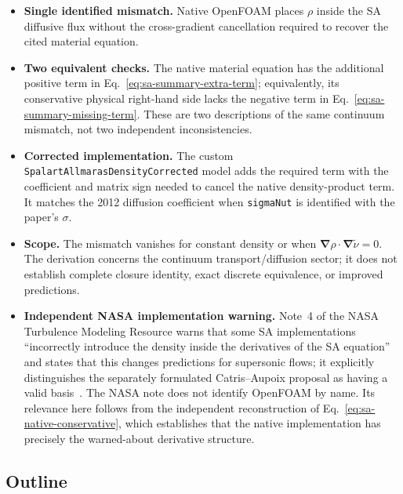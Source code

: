 \documentclass[11pt]{article}
\newcommand{\SAgrad}{\boldsymbol{\nabla}}
\newcommand{\SAcode}[1]{\texttt{#1}}
\newcommand{\SAOF}{OpenFOAM}
\newcommand{\SAnote}[2]{%
  \vspace{0.3em}%
  \noindent\colorbox{#1}{%
    \begin{minipage}{0.965\linewidth}
      #2
    \end{minipage}}%
  \vspace{0.3em}%
}
\begin{document}
\SAnote{SAHypLightBlue}{%
\begin{itemize}
  \item \textbf{Single identified mismatch.}  Native \SAOF{} places
    \(\rho\) inside the SA diffusive flux without the cross-gradient
    cancellation required to recover the cited material equation.
  \item \textbf{Two equivalent checks.}  The native material equation has
    the additional positive term in
    Eq.~\eqref{eq:sa-summary-extra-term}; equivalently, its conservative
    physical right-hand side lacks the negative term in
    Eq.~\eqref{eq:sa-summary-missing-term}.  These are two descriptions of
    the same continuum mismatch, not two independent inconsistencies.
  \item \textbf{Corrected implementation.}  The custom
    \SAcode{SpalartAllmarasDensityCorrected} model adds the required term with
    the coefficient and matrix sign needed to cancel the native
    density-product term.  It matches the 2012 diffusion coefficient when
    \SAcode{sigmaNut} is identified with the paper's \(\sigma\).
  \item \textbf{Scope.}  The mismatch vanishes for constant density or when
    \(\SAgrad\rho\cdot\SAgrad\widetilde{\nu}=0\).  The derivation concerns
    the continuum transport/diffusion sector; it does not establish complete
    closure identity, exact discrete equivalence, or improved predictions.
  \item \textbf{Independent NASA implementation warning.}  Note~4 of the
    NASA Turbulence Modeling Resource warns that some SA implementations
    ``incorrectly introduce the density inside the derivatives of the SA
    equation'' and states that this changes predictions for supersonic flows;
    it explicitly distinguishes the separately formulated Catris--Aupoix
    proposal as having a valid basis~\cite{NASATMRSA}.  The NASA note does not
    identify \SAOF{} by name.  Its relevance here follows from the independent
    reconstruction of Eq.~\eqref{eq:sa-native-conservative}, which establishes
    that the native implementation has precisely the warned-about derivative
    structure.
\end{itemize}
}

\subsection*{Outline}
\end{document}
